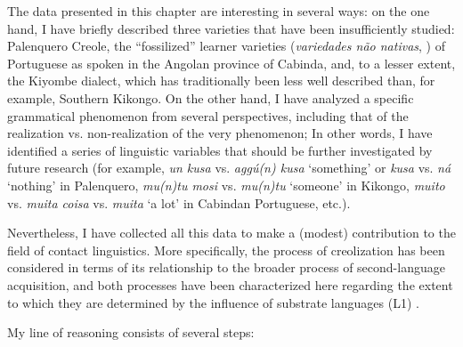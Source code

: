 \documentclass[output=paper,colorlinks,citecolor=brown]{langscibook}
\begin{document}
The data presented in this chapter are interesting in several ways: on the one hand, I have briefly described three varieties that have been insufficiently studied: Palenquero Creole, the “fossilized” learner varieties (\textit{variedades não nativas}, \cite{Gonçalves2010}) of Portuguese as spoken in the Angolan province of Cabinda, and, to a lesser extent, the Kiyombe dialect, which has traditionally been less well described than, for example, Southern Kikongo. On the other hand, I have analyzed a specific grammatical phenomenon from several perspectives, including that of the realization vs. non-realization of the very phenomenon; In other words, I have identified a series of linguistic variables that should be further investigated by future research (for example, \textit{un kusa} vs. \textit{aggú(n) kusa} ‘something’ or \textit{kusa} vs. \textit{ná} ‘nothing’ in Palenquero, \textit{mu(n)tu mosi} vs. \textit{mu(n)tu} ‘someone’ in Kikongo, \textit{muito} vs. \textit{muita coisa} vs. \textit{muita} ‘a lot’ in Cabindan Portuguese, etc.).

Nevertheless, I have collected all this data to make a (modest) contribution to the field of contact linguistics. More specifically, the process of creolization has been considered in terms of its relationship to the broader process of second-language acquisition, and both processes have been characterized here regarding the extent to which they are determined by the influence of substrate languages (L1) \citep[cf.][]{Winford2008, Winford2012}.

My line of reasoning consists of several steps:\largerpage
\end{document}
